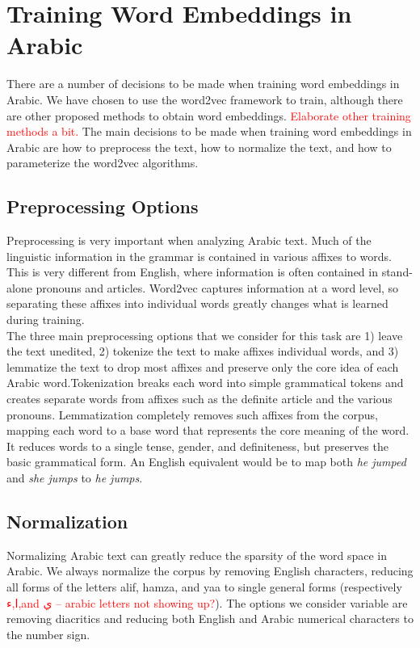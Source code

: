 \section{Training Word Embeddings in Arabic}

There are a number of decisions to be made when training word embeddings in Arabic. We have chosen to use the word2vec framework to train, although there are other proposed methods to obtain word embeddings. \textcolor{red}{Elaborate other training methods a bit.} The main decisions to be made when training word embeddings in Arabic are how to preprocess the text, how to normalize the text, and how to parameterize the word2vec algorithms.

\subsection{Preprocessing Options}

Preprocessing is very important when analyzing Arabic text. Much of the linguistic information in the grammar is contained in various affixes to words. This is very different from English, where information is often contained in stand-alone pronouns and articles. Word2vec captures information at a word level, so separating these affixes into individual words greatly changes what is learned during training.
\\
The three main preprocessing options that we consider for this task are 1) leave the text unedited, 2) tokenize the text to make affixes individual words, and 3) lemmatize the text to drop most affixes and preserve only the core idea of each Arabic word.Tokenization breaks each word into simple grammatical tokens and creates separate words from affixes such as the definite article and the various pronouns. Lemmatization completely removes such affixes from the corpus, mapping each word to a base word that represents the core meaning of the word. It reduces words to a single tense, gender, and definiteness, but preserves the basic grammatical form. An English equivalent would be to map both \textit{he jumped} and \textit{she jumps} to \textit{he jumps}.

\subsection{Normalization}

Normalizing Arabic text can greatly reduce the sparsity of the word space in Arabic. We always normalize the corpus by removing English characters, reducing all forms of the letters alif, hamza, and yaa to single general forms (respectively \textcolor{red}{ا,ء,and ي -- arabic letters not showing up?}). The options we consider variable are removing diacritics and reducing both English and Arabic numerical characters to the number sign.


